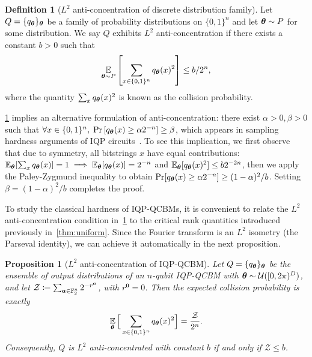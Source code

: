 \documentclass{article}
\theoremstyle{plain}
\newtheorem{proposition}[theorem]{Proposition}
\theoremstyle{definition}
\newtheorem{definition}[theorem]{Definition}
\theoremstyle{remark}
\begin{document}
\begin{definition}[$L^2$ anti-concentration of discrete distribution family]
\label{def:anti-concentration}
Let $Q = \{q_{\bm{\theta}}\}_{\bm{\theta}}$ be a family of probability distributions on $\{0,1\}^n$ and let ${\bm{\theta}} \sim P$ for some distribution. We say $Q$ exhibits $L^2$ anti-concentration if there exists a constant $b>0$ such that
\begin{equation}
    \operatorname*{\mathbb{E}}_{{\bm{\theta}} \sim P}\left[\sum_{x\in\{0,1\}^n} q_{\bm{\theta}}(x)^2\right] \leq b/2^n,
\end{equation}
where the quantity $\sum_x q_{\bm{\theta}}(x)^2$ is known as the collision probability.  
\end{definition}
\cref{def:anti-concentration} implies an alternative formulation of anti-concentration: there exist $\alpha>0,\beta>0$ such that $\forall x\in \{0,1\}^n, \;\Pr\left[q_{\bm{\theta}}(x)\geq \alpha 2^{-n}\right]\ge \beta$,
which appears in sampling hardness arguments of IQP circuits~\cite{Bremner16, Bremner17}. To see this implication, we first observe that due to symmetry, all bitstrings $x$ have equal contributions: $\mathbb{E}_{\bm{\theta}}[\sum_xq_{\bm{\theta}}(x)] = 1\implies \mathbb{E}_{\bm{\theta}}[q_{\bm{\theta}}(x)] = 2^{-n}$ and $\mathbb{E}_{\bm{\theta}}[q_{\bm{\theta}}(x)^2] \le b2^{-2n}$, then we apply the Paley-Zygmund inequality to obtain $\Pr[q_{\bm{\theta}}(x) \ge \alpha2^{-n}] \ge (1-\alpha)^2/b$. Setting $\beta = (1-\alpha)^2/b$ completes the proof.

To study the classical hardness of IQP-QCBMs, it is convenient to relate the $L^2$ anti-concentration condition in~\cref{def:anti-concentration} to the critical rank quantities introduced previously  in~\cref{thm:uniform}. Since the Fourier transform is an $L^2$ isometry (the Parseval identity), we can achieve it automatically in the next proposition.

\begin{proposition}[$L^2$ anti-concentration of IQP-QCBM]
\label{lem:parseval}
Let $Q=\{q_{\bm{\theta}}\}_{\bm{\theta}}$ be the ensemble of output distributions of an
$n$-qubit IQP-QCBM with ${\bm{\theta}}\sim\mathcal U([0,2\pi)^D)$, and let
$\mathcal Z \coloneqq \sum_{{\bm{a}}\in\mathbb{F}_2^n} 2^{-r^{\bm{a}}}$, with $r^{\mathbf 0}=0$.
Then the expected collision probability is exactly
\begin{equation}\label{eq:collision-identity}
\operatorname*{\mathbb{E}}_{{\bm{\theta}}}\Big[\sum_{x\in\{0,1\}^n} q_{\bm{\theta}}(x)^2\Big]
= \frac{\mathcal Z}{2^n}.
\end{equation}
Consequently, $Q$ is $L^2$ anti-concentrated with constant $b$ if and only if
$\mathcal Z\le b$. 
\end{proposition}
\end{document}
